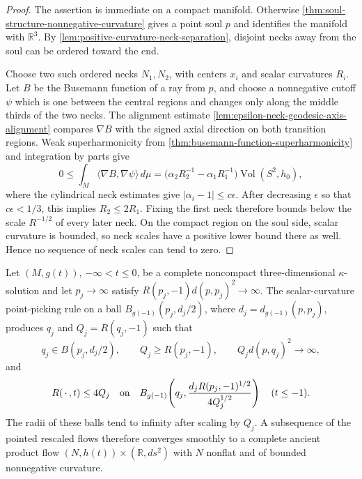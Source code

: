 \begin{proof}
The assertion is immediate on a compact manifold.  Otherwise
\ref{thm:soul-structure-nonnegative-curvature} gives a point soul $p$ and
identifies the manifold with $\mathbb R^3$.  By
\ref{lem:positive-curvature-neck-separation}, disjoint necks away from the
soul can be ordered toward the end.

Choose two such ordered necks $N_1,N_2$, with centers $x_i$ and scalar
curvatures $R_i$.  Let $B$ be the Busemann function of a ray from $p$, and
choose a nonnegative cutoff $\psi$ which is one between the central regions
and changes only along the middle thirds of the two necks.  The alignment
estimate \ref{lem:epsilon-neck-geodesic-axis-alignment} compares $\nabla B$
with the signed axial direction on both transition regions.  Weak
superharmonicity from \ref{thm:busemann-function-superharmonicity} and
integration by parts give
\[
 0\le \int_M\langle\nabla B,\nabla\psi\rangle\,d\mu
   =\bigl(\alpha_2R_2^{-1}-\alpha_1R_1^{-1}\bigr)
      \operatorname{Vol}(S^2,h_0),
\]
where the cylindrical neck estimates give
$|\alpha_i-1|\le c\epsilon$.  After decreasing $\epsilon$ so that
$c\epsilon<1/3$, this implies $R_2\le2R_1$.  Fixing the first neck therefore
bounds below the scale $R^{-1/2}$ of every later neck.  On the compact region
on the soul side, scalar curvature is bounded, so neck scales have a positive
lower bound there as well.  Hence no sequence of neck scales can tend to
zero.
\end{proof}

\begin{lemma}
\label{lem:kappa-point-picking-line}
\notready
Let $(M,g(t))$, $-\infty<t\le0$, be a complete noncompact three-dimensional
$\kappa$-solution and let $p_j\to\infty$ satisfy
$R(p_j,-1)d(p,p_j)^2\to\infty$.  The scalar-curvature point-picking rule on a
ball $B_{g(-1)}(p_j,d_j/2)$, where $d_j=d_{g(-1)}(p,p_j)$, produces
$q_j$ and $Q_j=R(q_j,-1)$ such that
\[
 q_j\in B(p_j,d_j/2),\qquad Q_j\ge R(p_j,-1),\qquad
 Q_jd(p,q_j)^2\longrightarrow\infty,
\]
and
\[
 R(\,\cdot\,,t)\le4Q_j
 \quad\hbox{on}\quad
 B_{g(-1)}\!\left(q_j,
   \frac{d_jR(p_j,-1)^{1/2}}{4Q_j^{1/2}}\right)
 \quad(t\le-1).
\]
The radii of these balls tend to infinity after scaling by $Q_j$.  A
subsequence of the pointed rescaled flows therefore converges smoothly to a
complete ancient product flow $(N,h(t))\times(\mathbb R,ds^2)$ with $N$
nonflat and of bounded nonnegative curvature.
\end{lemma}


